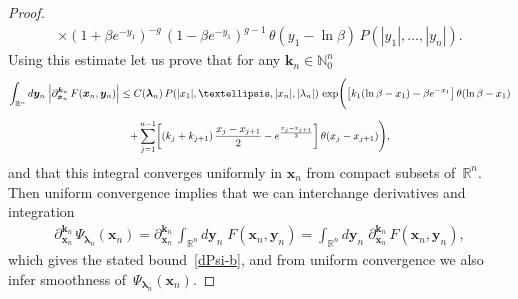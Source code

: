 \documentclass[10pt,a4paper]{amsart}
\begin{document}
\begin{proof}
\begin{multline}
		\times (1 + \beta e^{-y_1})^{- g} \, (1 - \beta e^{-y_1})^{g - 1} \, \theta(y_1 - \ln \beta) \, P(|y_1|, \dots, |y_n|).
	\end{multline}
	Using this estimate let us prove that for any $\bm{k}_n \in \mathbb{N}_0^n$
	\begin{multline} \label{dF-b2}
			\int_{\mathbb{R}^n} d\bm{y}_n \; \Bigl| \partial_{\bm{x}_n}^{\bm{k}_n} \, F (\bm{x}_n, \bm{y}_n) \Bigr| \leq C(\bm{\lambda}_n) \, P(|x_1|, \dots, |x_n|, |\lambda_n|) \, \exp\Biggl(  \bigl[ k_1 (\ln \beta - x_1) - \beta e^{-x_1} \bigr] \, \theta(\ln \beta - x_1) \\[6pt]
			+ \sum_{j = 1}^{n - 1} \biggl[ (k_j + k_{j + 1}) \, \frac{x_j - x_{j + 1}}{2} -  e^{ \frac{x_j - x_{j + 1} }{2} } \biggr] \, \theta(x_j - x_{j + 1} ) \Biggr),
	\end{multline}
	and that this integral converges uniformly in $\bm{x}_n$ from compact subsets of~$\mathbb{R}^n$. Then uniform convergence implies that we can interchange derivatives and integration
	\begin{align}
			\partial_{\bm{x}_n}^{\bm{k}_n} \, \Psi_{\bm{\lambda}_n}(\bm{x}_n) = \partial_{\bm{x}_n}^{\bm{k}_n} \, \int_{\mathbb{R}^{n}} d\bm{y}_{n} \;  F(\bm{x}_n, \bm{y}_{n}) = \int_{\mathbb{R}^{n}} d\bm{y}_{n} \;  \partial_{\bm{x}_n}^{\bm{k}_n} \, F(\bm{x}_n, \bm{y}_{n}),
	\end{align}
	which gives the stated bound~\eqref{dPsi-b}, and from uniform convergence we also infer smoothness of~$\Psi_{\bm{\lambda}_n}(\bm{x}_n)$.
	

\end{proof}
\end{document}
